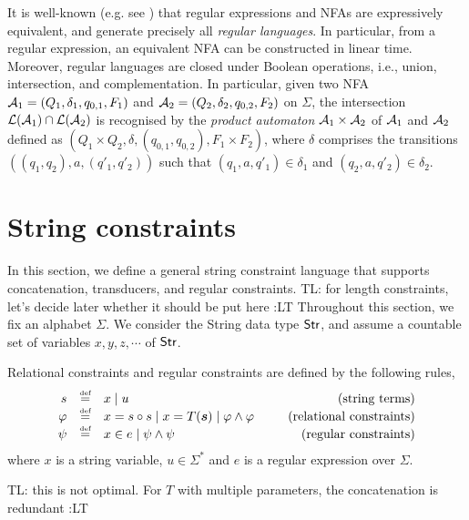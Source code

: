 \documentclass{llncs}
\newcommand{\tl}[1]{\color{blue} {TL: #1 :LT} \color{black}}
\newcommand{\tl}[1]{}
\newcommand{\concat} {\circ}
\newcommand{\str} {{\sf Str}}
\begin{document}
It is well-known (e.g. see \cite{HU79}) that regular expressions and NFAs are 
expressively equivalent, and generate precisely all \emph{regular languages}.
In particular, from a regular expression, an equivalent NFA can be constructed 
in linear time. Moreover, regular languages are closed under Boolean
operations, i.e., union, intersection, and complementation.
In particular, given two NFA $\mathcal{A}_1=(Q_1, \delta_1, q_{0,1}, F_1)$ and
$\mathcal{A}_2=(Q_2, \delta_2, q_{0,2}, F_2)$ on $\Sigma$, the intersection $\mathcal{L}(\mathcal{A}_1)
\cap \mathcal{L}(\mathcal{A}_2)$ is recognised by the \emph{product automaton} $\mathcal{A}_1 \times
\mathcal{A}_2$ of $\mathcal{A}_1$ and $\mathcal{A}_2$ defined as $(Q_1 \times Q_2, \delta, (q_{0,1}, q_{0,2}), F_1 \times F_2)$, where $\delta$ comprises the transitions $((q_1, q_2), a, (q'_1, q'_2))$ such that $(q_1, a, q'_1) \in \delta_1$ and $(q_2, a, q'_2) \in \delta_2$.  

\section{String constraints} \label{sec-core}

In this section, we define a general string constraint language that supports 
concatenation, transducers, and regular constraints. 
\tl{for length constraints, let's decide later whether it should be put here}
Throughout this section, we fix an alphabet $\Sigma$.
We consider the String data type $\str$, and assume a countable set of variables
$x, y, z, \cdots$ of $\str$.  


\begin{definition}
	Relational constraints and regular constraints are defined by the following rules,
	\[
	\begin{array}{r c l cr}
	s &\eqdef & x \mid u & \ \ & \mbox{(string terms)}\\
	\varphi &\eqdef & x = s \concat s  \mid  x = T(\vec{s}) \mid \varphi \wedge \varphi & \ \ & \mbox{(relational constraints)}\\
	\psi & \eqdef & x \in e \mid \psi \wedge \psi %
	& \ \ & \mbox{(regular constraints)} \\
	\end{array}
	\]
	where $x$ is a string variable, $u \in \Sigma^\ast$ and $e$ is a regular expression over $\Sigma$. 
\end{definition}
\tl{this is not optimal. For $T$ with multiple parameters, the concatenation is redundant}
\end{document}
